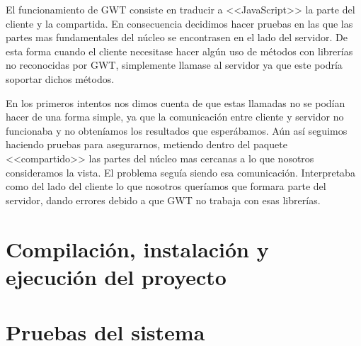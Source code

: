 El funcionamiento de GWT consiste en traducir a <<JavaScript>> la parte del cliente y la compartida. En consecuencia decidimos hacer pruebas en las que las partes mas fundamentales del núcleo se encontrasen en el lado del servidor. De esta forma cuando el cliente necesitase hacer algún uso de métodos con librerías no reconocidas por GWT, simplemente llamase al servidor ya que este podría soportar dichos métodos. 

En los primeros intentos nos dimos cuenta de que estas llamadas no se podían hacer de una forma simple, ya que la comunicación entre cliente y servidor no funcionaba y no obteníamos los resultados que esperábamos. Aún así seguimos haciendo pruebas para asegurarnos, metiendo dentro del paquete <<compartido>> las partes del núcleo mas cercanas a lo que nosotros consideramos la vista. El problema seguía siendo esa comunicación. Interpretaba como del lado del cliente lo que nosotros queríamos que formara parte del servidor, dando errores debido a que GWT no trabaja con esas librerías.

\section{Compilación, instalación y ejecución del proyecto}

\section{Pruebas del sistema}
